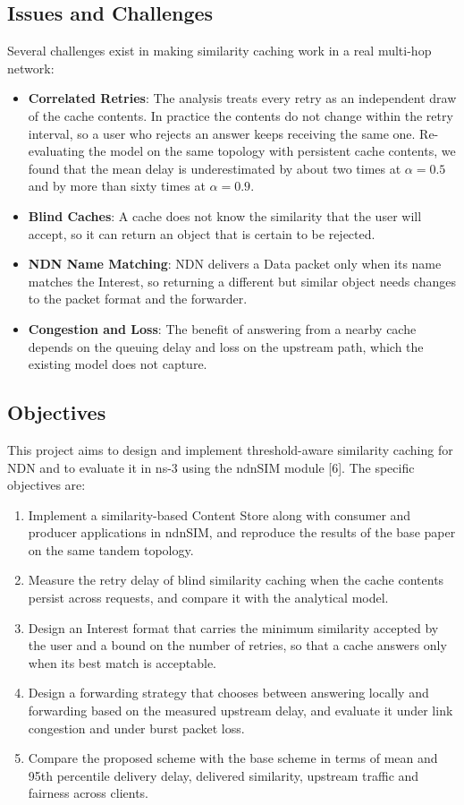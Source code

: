\documentclass[12pt,a4paper]{article}
\begin{document}
\subsection*{Issues and Challenges}
Several challenges exist in making similarity caching work in a real multi-hop network:
\begin{itemize}
  \item \textbf{Correlated Retries}: The analysis treats every retry as an independent draw of the
  cache contents. In practice the contents do not change within the retry interval, so a user who
  rejects an answer keeps receiving the same one. Re-evaluating the model on the same topology with
  persistent cache contents, we found that the mean delay is underestimated by about two times at
  $\alpha = 0.5$ and by more than sixty times at $\alpha = 0.9$.
  \item \textbf{Blind Caches}: A cache does not know the similarity that the user will accept, so it
  can return an object that is certain to be rejected.
  \item \textbf{NDN Name Matching}: NDN delivers a Data packet only when its name matches the
  Interest, so returning a different but similar object needs changes to the packet format and
  the forwarder.
  \item \textbf{Congestion and Loss}: The benefit of answering from a nearby cache depends on the
  queuing delay and loss on the upstream path, which the existing model does not capture.
\end{itemize}

\subsection*{Objectives}
This project aims to design and implement threshold-aware similarity caching for NDN and to
evaluate it in ns-3 using the ndnSIM module [6]. The specific objectives are:
\begin{enumerate}
  \item Implement a similarity-based Content Store along with consumer and producer applications
  in ndnSIM, and reproduce the results of the base paper on the same tandem topology.
  \item Measure the retry delay of blind similarity caching when the cache contents persist across
  requests, and compare it with the analytical model.
  \item Design an Interest format that carries the minimum similarity accepted by the user and a
  bound on the number of retries, so that a cache answers only when its best match is acceptable.
  \item Design a forwarding strategy that chooses between answering locally and forwarding based on
  the measured upstream delay, and evaluate it under link congestion and under burst packet loss.
  \item Compare the proposed scheme with the base scheme in terms of mean and 95th percentile
  delivery delay, delivered similarity, upstream traffic and fairness across clients.
\end{enumerate}
\end{document}
